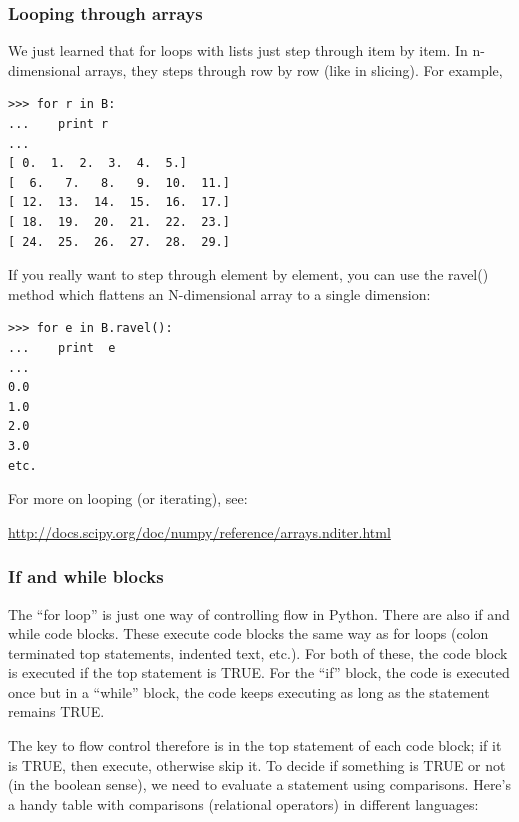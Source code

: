 \documentclass[11pt]{book}
\begin{document}
{{{ \subsubsection{Looping through arrays}

We just learned that  {\color{blue} for} loops with lists  just step through item by item.  In n-dimensional arrays, they steps through row by row (like in slicing).  For example, 
 

{ \color{blue} \begin{verbatim}
>>> for r in B:
...    print r
... 
[ 0.  1.  2.  3.  4.  5.]
[  6.   7.   8.   9.  10.  11.]
[ 12.  13.  14.  15.  16.  17.]
[ 18.  19.  20.  21.  22.  23.]
[ 24.  25.  26.  27.  28.  29.]
\end{verbatim}}

If you really want to step through element by element, you can use the {\color{blue}ravel()} method which flattens an N-dimensional array to a single dimension:

{ \color{blue} \begin{verbatim}
>>> for e in B.ravel():
...    print  e
... 
0.0
1.0
2.0
3.0
etc.
\end{verbatim}}

For more on looping (or iterating), see:

\url{http://docs.scipy.org/doc/numpy/reference/arrays.nditer.html}


      
\subsubsection{If and while blocks}

The ``for loop'' is just one way of controlling flow in Python.  There are also {\color{blue}if}  and  {\color{blue}while} code blocks.  These execute code blocks  the same way as for loops (colon terminated top statements, indented text, etc.).  For both of these, the code block is executed if the top statement is  TRUE.  For the ``if'' block, the code is executed once but in a ``while'' block, the code keeps executing as long as the statement remains TRUE.  

The key to flow control therefore is in the top statement of each code block;  if it is TRUE, then execute, otherwise skip it.  To decide if something is TRUE or not (in the boolean sense), we need to evaluate a statement using comparisons.   Here's a handy table with comparisons (relational operators) in different languages:

}}}
\end{document}
